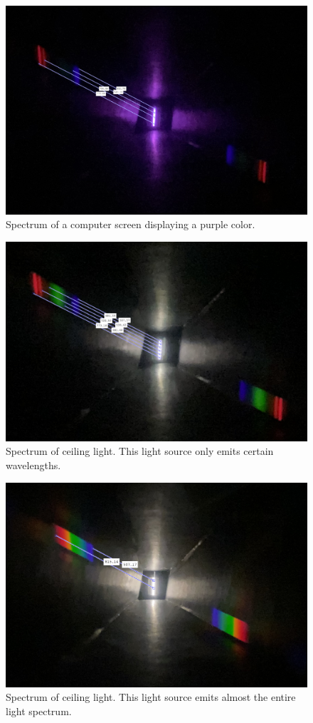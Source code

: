     \begin{figure}[H]
        \centering
        \includegraphics[scale = 0.25]{src/images/purple_screen_meas.png}
        \caption{Spectrum of a computer screen displaying a purple color.}
        \label{fig_purple_screen}
    \end{figure}

    \begin{figure}[H]
        \centering
        \includegraphics[scale = 0.31]{src/images/lamp1_meas.png}
        \caption{Spectrum of ceiling light. This light source only emits certain wavelengths.}
        \label{fig_lamp1}
    \end{figure}

    \begin{figure}[H]
        \centering
        \includegraphics[scale = 0.41]{src/images/lamp2_meas.png}
        \caption{Spectrum of ceiling light. This light source emits almost the entire light spectrum.}
        \label{fig_lamp2}
    \end{figure}